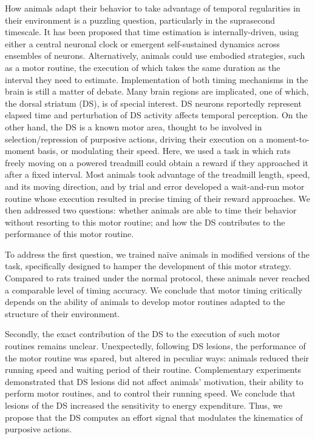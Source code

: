 How animals adapt their behavior to take advantage of temporal regularities in their environment is a puzzling question, particularly in the suprasecond timescale.
It has been proposed that time estimation is internally-driven, using either a central neuronal clock or emergent self-sustained dynamics across ensembles of neurons.
Alternatively, animals could use embodied strategies, such as a motor routine, the execution of which takes the same duration as the interval they need to estimate.
Implementation of both timing mechanisms in the brain is still a matter of debate.
Many brain regions are implicated, one of which, the dorsal striatum (DS), is of special interest.
DS neurons reportedly represent elapsed time and perturbation of DS activity affects temporal perception.
On the other hand, the DS is a known motor area, thought to be involved in selection/repression of purposive actions, driving their execution on a moment-to-moment basis, or modulating their speed.
Here, we used a task in which rats freely moving on a powered treadmill could obtain a reward if they approached it after a fixed interval.
Most animals took advantage of the treadmill length, speed, and its moving direction, and by trial and error developed a wait-and-run motor routine whose execution resulted in precise timing of their reward approaches.
We then addressed two questions:
    whether animals are able to time their behavior without resorting to this motor routine;
    and how the DS contributes to the performance of this motor routine.

\par

To address the first question, we trained na\"ive animals in modified versions of the task, specifically designed to hamper the development of this motor strategy.
Compared to rats trained under the normal protocol, these animals never reached a comparable level of timing accuracy.
We conclude that motor timing critically depends on the ability of animals to develop motor routines adapted to the structure of their environment.

\par

Secondly, the exact contribution of the DS to the execution of such motor routines remains unclear.
Unexpectedly, following DS lesions, the performance of the motor routine was spared, but altered in peculiar ways:
    animals reduced their running speed and waiting period of their routine.
Complementary experiments demonstrated that DS lesions did not affect animals' motivation, their ability to perform motor routines, and to control their running speed.
We conclude that lesions of the DS increased the sensitivity to energy expenditure.
Thus, we propose that the DS computes an effort signal that modulates the kinematics of purposive actions.